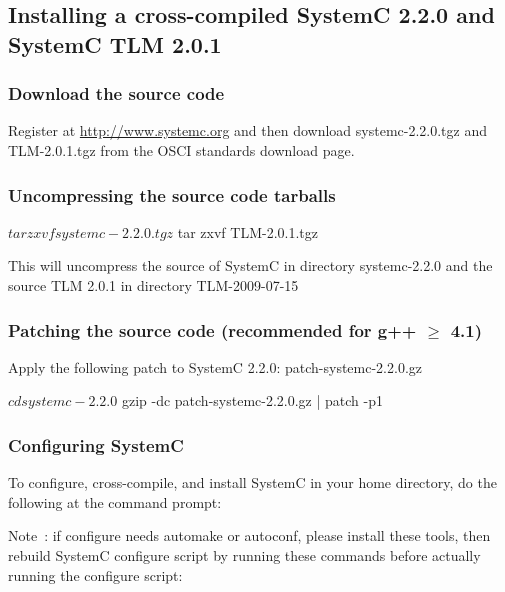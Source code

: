 \subsection{Installing a cross-compiled SystemC 2.2.0 and SystemC TLM 2.0.1}
\subsubsection{Download the source code}
Register at \url{http://www.systemc.org} and then download systemc-2.2.0.tgz and TLM-2.0.1.tgz from the OSCI standards download page.

\subsubsection{Uncompressing the source code tarballs}
\begin{script}
   $ tar zxvf systemc-2.2.0.tgz
   $ tar zxvf TLM-2.0.1.tgz
\end{script}
  
This will uncompress the source of SystemC in directory systemc-2.2.0 and the source TLM 2.0.1 in directory TLM-2009-07-15 
\subsubsection{Patching the source code (recommended for g++ $\geq$ 4.1)}
Apply the following patch to SystemC 2.2.0: patch-systemc-2.2.0.gz 

\begin{script}
   $ cd systemc-2.2.0
   $ gzip -dc patch-systemc-2.2.0.gz | patch -p1
\end{script}

\subsubsection{Configuring SystemC}
To configure, cross-compile, and install SystemC in your home directory, do the following at the command prompt: 


Note : if configure needs automake or autoconf, please install these tools, then rebuild SystemC configure script by running these commands before actually running the configure script:

